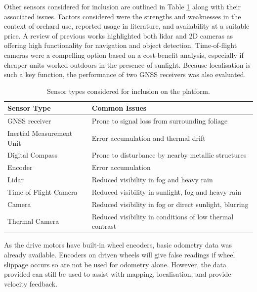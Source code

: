 \documentclass[preprint,authoryear,12pt]{elsarticle}
\begin{document}
    Other sensors considered for inclusion are outlined in Table \ref{table:sensor_comparison} along with their associated issues.
    Factors considered were the strengths and weaknesses in the context of orchard use, reported usage in literature, and availability at a suitable price.
    A review of previous works highlighted both lidar and 2D cameras as offering high functionality for navigation and object detection.
    Time-of-flight cameras were a compelling option based on a cost-benefit analysis, especially if cheaper units worked outdoors in the presence of sunlight.
    Because localisation is such a key function, the performance of two GNSS receivers was also evaluated.

    \begin{table}[htbp]
        \centering
        \footnotesize
        \begin{tabular}{ l l}

            \textbf{Sensor Type}      &\textbf{Common Issues} \\ \hline
            GNSS receiver              & Prone to signal loss from surrounding foliage\\  \hline
            Inertial Measurement Unit & Error accumulation and thermal drift\\ \hline
            Digital Compass           & Prone to disturbance by nearby metallic structures\\ \hline
            Encoder                   & Error accumulation \\ \hline
            Lidar                     & Reduced visibility in fog and heavy rain \\ \hline
            Time of Flight Camera     & Reduced visibility in sunlight, fog and heavy rain \\ \hline
            Camera                    & Reduced visibility in fog or direct sunlight, blurring \\ \hline
            Thermal Camera            & Reduced visibility in conditions of low thermal contrast\\ \hline
        \end{tabular}
        \caption{Sensor types considered for inclusion on the platform.}
        \label{table:sensor_comparison}
    \end{table}

    As the drive motors have built-in wheel encoders, basic odometry data was already available.
    Encoders on driven wheels will give false readings if wheel slippage occurs so are not be used for odometry alone.
    However, the data provided can still be used to assist with mapping, localisation, and provide velocity feedback.
\end{document}
